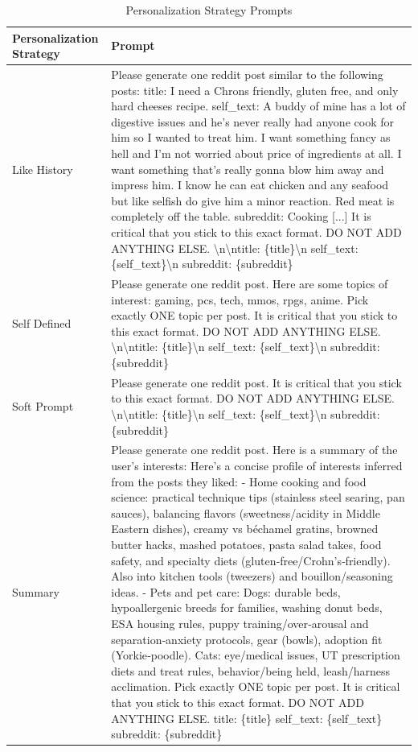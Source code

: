 \documentclass[11pt]{article}
\begin{document}
\begin{longtable}{|p{3cm}|p{10cm}|}
\caption{Personalization Strategy Prompts}\\
\hline
\textbf{Personalization Strategy} & \textbf{Prompt} \\
\hline
Like History & Please generate one reddit post similar to the following posts:
title: I need a Chrons friendly, gluten free, and only hard cheeses recipe.
self\_text: A buddy of mine has a lot of digestive issues and he's never really had anyone cook for him so I wanted to treat him. I want something fancy as hell and I'm not worried about price of ingredients at all. I want something that's really gonna blow him away and impress him. I know he can eat chicken and any seafood but like selfish do give him a minor reaction. Red meat is completely off the table.
subreddit: Cooking [...] It is critical that you stick to this exact format. DO NOT ADD ANYTHING ELSE. \textbackslash n\textbackslash ntitle: \{title\}\textbackslash n self\_text: \{self\_text\}\textbackslash n subreddit: \{subreddit\}
 \\
\hline
Self Defined & Please generate one reddit post. Here are some topics of interest: gaming, pcs, tech, mmos, rpgs, anime. Pick exactly ONE topic per post. It is critical that you stick to this exact format. DO NOT ADD ANYTHING ELSE. \textbackslash n\textbackslash ntitle: \{title\}\textbackslash n self\_text: \{self\_text\}\textbackslash n subreddit: \{subreddit\} \\
\hline
Soft Prompt & Please generate one reddit post. It is critical that you stick to this exact format. DO NOT ADD ANYTHING ELSE. \textbackslash n\textbackslash ntitle: \{title\}\textbackslash n self\_text: \{self\_text\}\textbackslash n subreddit: \{subreddit\} \\
\hline
Summary & Please generate one reddit post. Here is a summary of the user's interests: Here’s a concise profile of interests inferred from the posts they liked: - Home cooking and food science: practical technique tips (stainless steel searing, pan sauces), balancing flavors (sweetness/acidity in Middle Eastern dishes), creamy vs béchamel gratins, browned butter hacks, mashed potatoes, pasta salad takes, food safety, and specialty diets (gluten‑free/Crohn’s‑friendly). Also into kitchen tools (tweezers) and bouillon/seasoning ideas. - Pets and pet care: Dogs: durable beds, hypoallergenic breeds for families, washing donut beds, ESA housing rules, puppy training/over‑arousal and separation‑anxiety protocols, gear (bowls), adoption fit (Yorkie‑poodle). Cats: eye/medical issues, UT prescription diets and treat rules, behavior/being held, leash/harness acclimation.  Pick exactly ONE topic per post. It is critical that you stick to this exact format. DO NOT ADD ANYTHING ELSE. title: \{title\} self\_text: \{self\_text\} subreddit: \{subreddit\} \\
\hline
\end{longtable}
\end{document}
